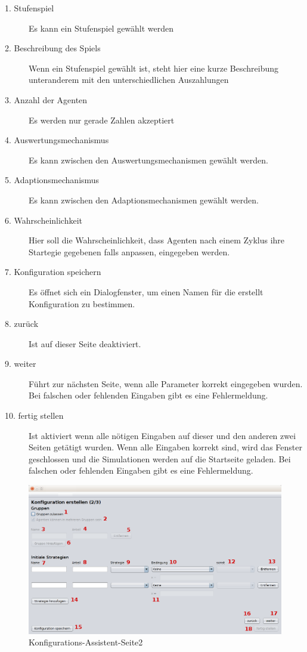 \begin{description}

\item[1. Stufenspiel] Es kann ein Stufenspiel gewählt werden

\item[2. Beschreibung des Spiels] Wenn ein Stufenspiel gewählt ist, steht hier eine kurze Beschreibung unteranderem mit den unterschiedlichen Auszahlungen

\item[3. Anzahl der Agenten] Es werden nur gerade Zahlen akzeptiert

\item[4. Auswertungsmechanismus] Es kann zwischen den Auswertungsmechanismen gewählt werden.

\item[5. Adaptionsmechanismus] Es kann zwischen den Adaptionsmechanismen gewählt werden.

\item[6. Wahrscheinlichkeit] Hier soll die Wahrscheinlichkeit, dass Agenten nach einem Zyklus ihre Startegie gegebenen falls anpassen, eingegeben werden.

\item[7. Konfiguration speichern] Es öffnet sich ein Dialogfenster, um einen Namen für die erstellt Konfiguration zu bestimmen.

\item[8. zurück] Ist auf dieser Seite deaktiviert.

\item[9. weiter] Führt zur nächsten Seite, wenn alle Parameter korrekt eingegeben wurden. Bei falschen oder fehlenden Eingaben gibt es eine Fehlermeldung.

\item[10. fertig stellen] Ist aktiviert wenn alle nötigen Eingaben auf dieser und den anderen zwei Seiten getätigt wurden. Wenn alle Eingaben korrekt sind, wird das Fenster geschlossen und die Simulationen werden auf die Startseite geladen. Bei falschen oder fehlenden Eingaben gibt es eine Fehlermeldung.

\end{description}

\pagebreak

\begin{figure}[hp] 
  \centering
     \includegraphics[width=1.1\textwidth]{GUI_Entwurf/WizardFenster2.png}
  \caption{Konfigurations-Assistent-Seite2}
  \label{fig:Bild3}
\end{figure}

